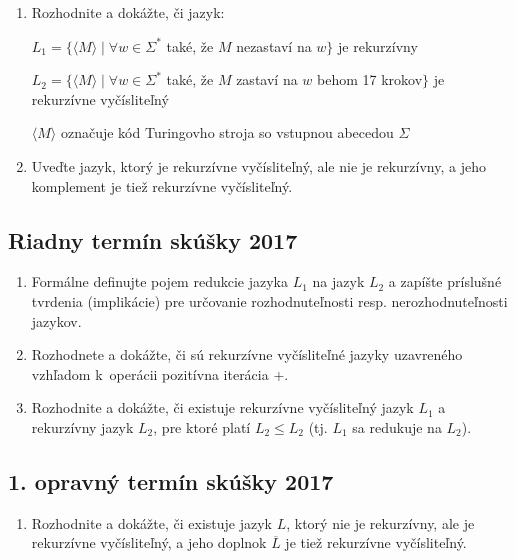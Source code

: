 \documentclass[11pt,a4paper]{article}
\begin{document}
		\begin{enumerate}
			\item Rozhodnite a dokážte, či jazyk:
			
			$L_1 = \{\langle M \rangle \mid \forall w \in \Sigma^*$ také, že $M$ nezastaví na $w\}$ je rekurzívny
			
			$L_2 = \{\langle M \rangle \mid \forall w \in \Sigma^*$ také, že $M$ zastaví na $w$ behom 17 krokov$\}$ je rekurzívne vyčísliteľný
			
			$\langle M \rangle$ označuje kód Turingovho stroja so vstupnou abecedou $\Sigma$
			
			\item Uveďte jazyk, ktorý je rekurzívne vyčísliteľný, ale nie je rekurzívny, a jeho komplement je tiež rekurzívne vyčísliteľný.
		\end{enumerate}	

		\subsection{Riadny termín skúšky 2017}

		\begin{enumerate}
			\item Formálne definujte pojem redukcie jazyka $L_1$ na jazyk $L_2$ a zapíšte príslušné tvrdenia (implikácie) pre určovanie rozhodnuteľnosti resp. nerozhodnuteľnosti jazykov.

			\item Rozhodnete a dokážte, či sú rekurzívne vyčísliteľné jazyky uzavreného vzhľadom k~operácii pozitívna iterácia +.
	
			\item Rozhodnite a dokážte, či existuje rekurzívne vyčísliteľný jazyk $L_1$ a rekurzívny jazyk $L_2$, pre ktoré platí $L_2 \leq L_2$ (tj. $L_1$ sa redukuje na $L_2$).
		\end{enumerate}	
			
		\subsection{1. opravný termín skúšky 2017}

		\begin{enumerate}
			\item Rozhodnite a dokážte, či existuje jazyk $L$, ktorý nie je rekurzívny, ale je rekurzívne vyčísliteľný, a jeho doplnok $\overline{L}$ je tiež rekurzívne vyčísliteľný.
		\end{enumerate}	
\end{document}
